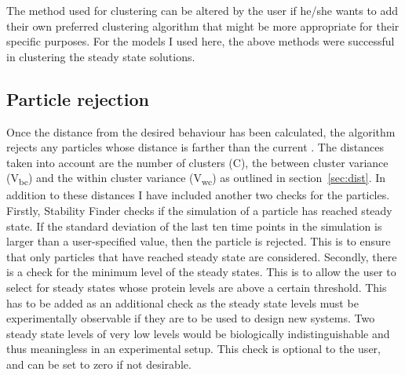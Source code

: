 The method used for clustering can be altered by the user if he/she wants to add their own preferred clustering algorithm that might be more appropriate for their specific purposes. For the models I used here, the above methods were successful in clustering the steady state solutions. 

\subsection{Particle rejection}
\label{sec:rej}

Once the distance from the desired behaviour has been calculated, the algorithm rejects any particles whose distance is farther than the current \textepsilon. The distances taken into account are the number of clusters (C), the between cluster variance (V\textsubscript{bc}) and the within cluster variance (V\textsubscript{wc}) as outlined in section~\ref{sec:dist}. In addition to these distances I have included another two checks for the particles. Firstly, Stability Finder checks if the simulation of a particle has reached steady state. If the standard deviation of the last ten time points in the simulation is larger than a user-specified value, then the particle is rejected. This is to ensure that only particles that have reached steady state are considered. Secondly, there is a check for the minimum level of the steady states. This is to allow the user to select for steady states whose protein levels are above a certain threshold. This has to be added as an additional check as the steady state levels must be experimentally observable if they are to be used to design new systems. Two steady state levels of very low levels would be biologically indistinguishable and thus meaningless in an experimental setup. This check is optional to the user, and can be set to zero if not desirable. %
% 

